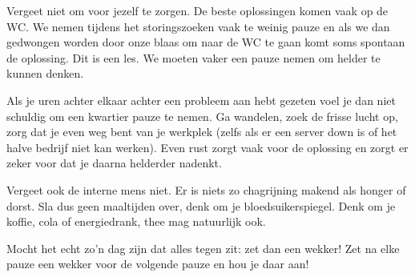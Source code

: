 Vergeet niet om voor jezelf te zorgen. De beste oplossingen komen vaak op de WC. We nemen tijdens het storingszoeken vaak te weinig pauze en als we dan gedwongen worden door onze blaas om naar de WC te gaan komt soms spontaan de oplossing. Dit is een les. We moeten vaker een pauze nemen om helder te kunnen denken.

Als je uren achter elkaar achter een probleem aan hebt gezeten voel je dan niet schuldig om een kwartier pauze te nemen. Ga wandelen, zoek de frisse lucht op, zorg dat je even weg bent van je werkplek (zelfs als er een server down is of het halve bedrijf niet kan werken). Even rust zorgt vaak voor de oplossing en zorgt er zeker voor dat je daarna helderder nadenkt.

Vergeet ook de interne mens niet. Er is niets zo chagrijning makend als honger of dorst. Sla dus geen maaltijden over, denk om je bloedsuikerspiegel. Denk om je koffie, cola of energiedrank, thee mag natuurlijk ook.

Mocht het echt zo'n dag zijn dat alles tegen zit: zet dan een wekker! Zet na elke pauze een wekker voor de volgende pauze en hou je daar aan!

